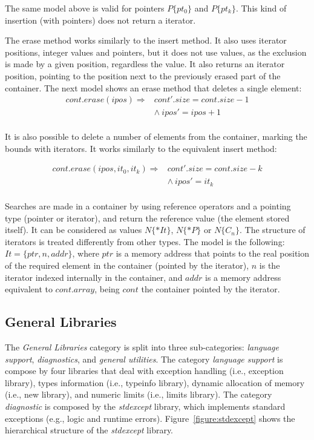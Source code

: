 \documentclass[a4paper]{llncs}
\begin{document}
The same model above is valid for pointers $P\{pt_0\}$ and $P\{pt_k\}$.
This kind of insertion (with pointers) does not return a iterator.

The erase method works similarly to the insert method. It also uses iterator
positions, integer values and pointers, but it does not use values, as the exclusion
is made by a given position, regardless the value. It also returns an iterator position,
pointing to the position next to the previously erased part of the container.
The next model shows an erase method that deletes a single element:
%
\[\begin{array}{ll}
\label{erase1-model}
cont.erase (ipos) \Longrightarrow & cont'.size = cont.size - 1\\
  & \wedge \: ipos' = ipos + 1 \\
\end{array}\]

It is also possible to delete a number of elements from the container,
marking the bounds with iterators. It works similarly to the equivalent
insert method:

\[\begin{array}{ll}
\label{erase2-model}
cont.erase (ipos, it_0, it_k) \Longrightarrow & 	cont'.size = cont.size - k\\
  & \wedge \:	ipos' = it_k \\
\end{array}\]

Searches are made in a container by using reference operators
and a pointing type (pointer or iterator), and return the reference
value (the element stored itself). It can be considered as values
$N\{*It\}$, $N\{*P\}$ or $N\{C_n\}$.	The structure of iterators
is treated differently from other types. The model is the following:
$It = \{ ptr, n, addr\}$,
where $ptr$ is a memory address that points to the
real position of the required element in the container
(pointed by the iterator), $n$ is the iterator indexed
internally in the container, and $addr$ is a memory
address equivalent to $cont.array$, being $cont$ the container
pointed by the iterator.

\subsection{General Libraries}

The \textit{General Libraries} category is split into three
sub-categories: \textit{language support}, \textit{diagnostics},
and \textit{general utilities}. The category \textit{language support}
is compose by four libraries that deal with exception handling
(i.e., exception library), types information (i.e., typeinfo library),
dynamic allocation of memory (i.e., new library), and numeric limits
(i.e., limits library). The category \textit{diagnostic} is composed by
the \textit{stdexcept} library, which implements standard exceptions
(e.g., logic and runtime errors). Figure~\ref{figure:stdexcept}
shows the hierarchical structure of the \textit{stdexcept} library.
\end{document}
